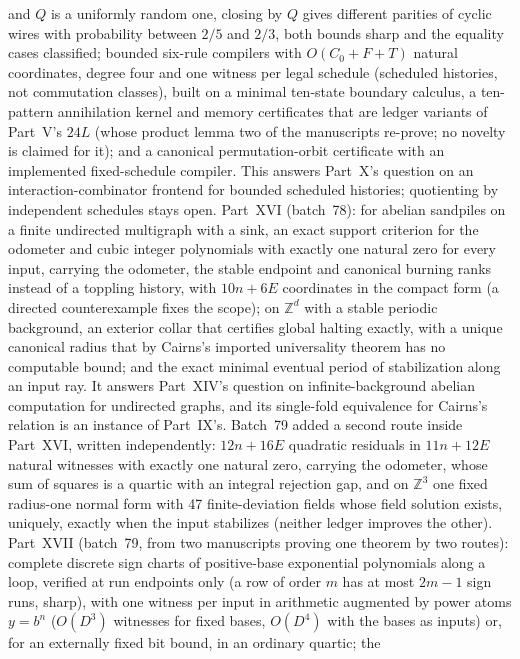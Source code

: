 \documentclass[11pt]{article}
\begin{document}
{and $Q$ is a uniformly random one, closing by $Q$ gives different parities of
cyclic wires with probability between $2/5$ and $2/3$, both bounds sharp and
the equality cases classified; bounded six-rule compilers with
$O(C_0+F+T)$ natural coordinates, degree four and one witness per legal
schedule (scheduled histories, not commutation classes), built on a minimal
ten-state boundary calculus, a ten-pattern annihilation kernel and memory
certificates that are ledger variants of Part~V's $24L$ (whose product lemma
two of the manuscripts re-prove; no novelty is claimed for it); and a
canonical permutation-orbit certificate with an implemented fixed-schedule
compiler.  This answers Part~X's question on an interaction-combinator
frontend for bounded scheduled histories; quotienting by independent
schedules stays open.  Part~XVI (batch~78): for abelian sandpiles on a
finite undirected multigraph with a sink, an exact support criterion for
the odometer and cubic integer polynomials with exactly one natural zero
for every input, carrying the odometer, the stable endpoint and canonical
burning ranks instead of a toppling history, with $10n+6E$ coordinates in
the compact form (a directed counterexample fixes the scope); on
$\mathbb Z^d$ with a stable periodic background, an exterior collar that
certifies global halting exactly, with a unique canonical radius that by
Cairns's imported universality theorem has no computable bound; and the
exact minimal eventual period of stabilization along an input ray.  It
answers Part~XIV's question on infinite-background abelian computation for
undirected graphs, and its single-fold equivalence for Cairns's relation is
an instance of Part~IX's.  Batch~79 added a second route inside
Part~XVI, written independently: $12n+16E$ quadratic residuals in $11n+12E$
natural witnesses with exactly one natural zero, carrying the odometer,
whose sum of squares is a quartic with an integral rejection gap, and on
$\mathbb Z^3$ one fixed radius-one normal form with 47 finite-deviation
fields whose field solution exists, uniquely, exactly when the input
stabilizes (neither ledger improves the other).  Part~XVII (batch~79, from
two manuscripts proving one theorem by two routes): complete discrete sign
charts of positive-base exponential polynomials along a loop, verified at
run endpoints only (a row of order $m$ has at most $2m-1$ sign runs,
sharp), with one witness per input in arithmetic augmented by power atoms
$y=b^n$ ($O(D^3)$ witnesses for fixed bases, $O(D^4)$ with the bases as
inputs) or, for an externally fixed bit bound, in an ordinary quartic; the
}
\end{document}
